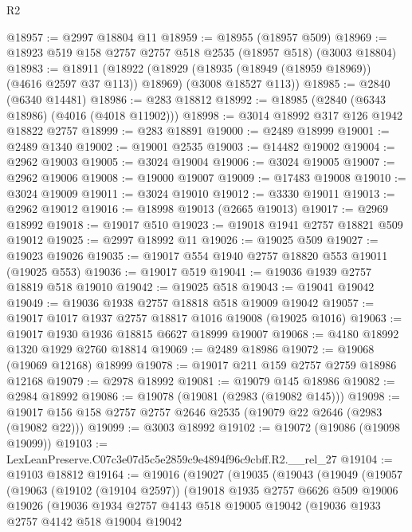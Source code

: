 \begin{lexlean}{R2}
\begin{coremodule}
@18957 := @2997 @18804 @11
@18959 := @18955 (@18957 @509)
@18969 := @18923 @519 @158 @2757 @2757 @518 @2535 (@18957 @518) (@3003 @18804)
@18983 := @18911
    (@18922
      (@18929 (@18935 (@18949 (@18959 @18969)) (@4616 @2597 @37 @113)) @18969)
      (@3008 @18527 @113))
@18985 := @2840 (@6340 @14481)
@18986 := @283 @18812
@18992 := @18985 (@2840 (@6343 @18986) (@4016 (@4018 @11902)))
@18998 := @3014 @18992 @317 @126 @1942 @18822 @2757
@18999 := @283 @18891
@19000 := @2489 @18999
@19001 := @2489 @1340
@19002 := @19001 @2535
@19003 := @14482 @19002
@19004 := @2962 @19003
@19005 := @3024 @19004
@19006 := @3024 @19005
@19007 := @2962 @19006
@19008 := @19000 @19007
@19009 := @17483 @19008
@19010 := @3024 @19009
@19011 := @3024 @19010
@19012 := @3330 @19011
@19013 := @2962 @19012
@19016 := @18998 @19013 (@2665 @19013)
@19017 := @2969 @18992
@19018 := @19017 @510
@19023 := @19018 @1941 @2757 @18821 @509 @19012
@19025 := @2997 @18992 @11
@19026 := @19025 @509
@19027 := @19023 @19026
@19035 := @19017 @554 @1940 @2757 @18820 @553 @19011 (@19025 @553)
@19036 := @19017 @519
@19041 := @19036 @1939 @2757 @18819 @518 @19010
@19042 := @19025 @518
@19043 := @19041 @19042
@19049 := @19036 @1938 @2757 @18818 @518 @19009 @19042
@19057 := @19017 @1017 @1937 @2757 @18817 @1016 @19008 (@19025 @1016)
@19063 := @19017 @1930 @1936 @18815 @6627 @18999 @19007
@19068 := @4180 @18992 @1320 @1929 @2760 @18814
@19069 := @2489 @18986
@19072 := @19068 (@19069 @12168) @18999
@19078 := @19017 @211 @159 @2757 @2759 @18986 @12168
@19079 := @2978 @18992
@19081 := @19079 @145 @18986
@19082 := @2984 @18992
@19086 := @19078 (@19081 (@2983 (@19082 @145)))
@19098 := @19017 @156 @158 @2757 @2757 @2646 @2535 (@19079 @22 @2646 (@2983 (@19082 @22)))
@19099 := @3003 @18992
@19102 := @19072 (@19086 (@19098 @19099))
@19103 := LexLeanPreserve.C07c3e07d5c5e2859c9e4894f96c9cbff.R2.__rel_27
@19104 := @19103 @18812
@19164 := @19016
    (@19027
      (@19035
        (@19043
          (@19049
            (@19057
              (@19063
                (@19102 (@19104 @2597))
                (@19018
                  @1935
                  @2757
                  @6626
                  @509
                  @19006
                  @19026
                  (@19036
                    @1934
                    @2757
                    @4143
                    @518
                    @19005
                    @19042
                    (@19036
                      @1933
                      @2757
                      @4142
                      @518
                      @19004
                      @19042

\end{coremodule}
\end{lexlean}
